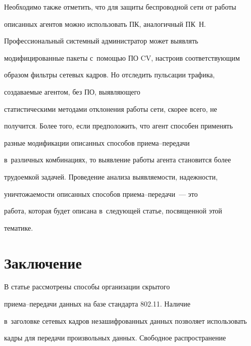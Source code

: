   Необходимо также отметить, что для защиты беспроводной сети от работы


описанных агентов можно использовать ПК, аналогичный ПК~Н.


Профессиональный системный администратор может выявлять


модифицированные пакеты с~по\-мощью ПО CV, настроив соответствующим


образом фильтры сетевых кадров. Но отследить пульсации трафика,


создаваемые агентом, без ПО, выявляющего


статистическими методами отклонения работы сети, скорее всего, не


получится. Более того, если предположить, что агент способен применять


разные модификации описанных способов при\-е\-ма--пе\-ре\-да\-чи


в~различных комбинациях, то выявление работы агента становится более


трудоемкой задачей. Проведение анализа выявляемости, надежности,


уничтожаемости описанных способов при\-е\-ма--пе\-ре\-да\-чи~--- это


работа, которая будет описана в~сле\-ду\-ющей статье, посвященной этой


тематике.





\vspace*{-2pt}





\section{Заключение}





\vspace*{-2pt}





  В статье рассмотрены способы организации скрытого


  при\-е\-ма--пе\-ре\-да\-чи данных на базе стандарта 802.11. Наличие


  в~заголовке сетевых кадров не\-за\-шиф\-ро\-ван\-ных данных позволяет использовать


кадры для передачи произвольных данных. Свободное распространение


